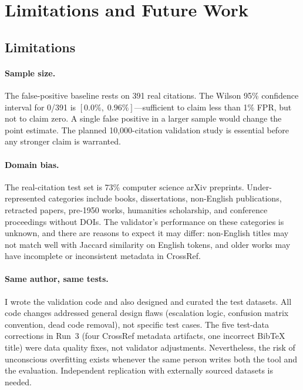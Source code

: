 \section{Limitations and Future Work}

\subsection{Limitations}

\paragraph{Sample size.} The false-positive baseline rests on 391 real citations. The Wilson 95\% confidence interval for 0/391 is $[0.0\%,\; 0.96\%]$---sufficient to claim less than 1\% FPR, but not to claim zero. A single false positive in a larger sample would change the point estimate. The planned 10{,}000-citation validation study is essential before any stronger claim is warranted.

\paragraph{Domain bias.} The real-citation test set is 73\% computer science arXiv preprints. Under-represented categories include books, dissertations, non-English publications, retracted papers, pre-1950 works, humanities scholarship, and conference proceedings without DOIs. The validator's performance on these categories is unknown, and there are reasons to expect it may differ: non-English titles may not match well with Jaccard similarity on English tokens, and older works may have incomplete or inconsistent metadata in CrossRef.

\paragraph{Same author, same tests.} I wrote the validation code and also designed and curated the test datasets. All code changes addressed general design flaws (escalation logic, confusion matrix convention, dead code removal), not specific test cases. The five test-data corrections in Run~3 (four CrossRef metadata artifacts, one incorrect BibTeX title) were data quality fixes, not validator adjustments. Nevertheless, the risk of unconscious overfitting exists whenever the same person writes both the tool and the evaluation. Independent replication with externally sourced datasets is needed.

